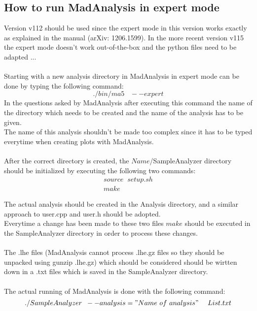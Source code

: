 \subsection{How to run MadAnalysis in expert mode}
Version v112 should be used since the expert mode in this version works exactly as explained in the manual (arXiv: 1206.1599). 
In the more recent version v115 the expert mode doesn't work out-of-the-box and the python files need to be adapted ...\\
\\
Starting with a new analysis directory in MadAnalysis in expert mode can be done by typing the following command:
\begin{equation}
  ./bin/ma5 \; \; \; --expert
\end{equation}
In the questions asked by MadAnalysis after executing this command the name of the directory which needs to be created and the name of the analysis has to be given.\\
The name of this analysis shouldn't be made too complex since it has to be typed everytime when creating plots with MadAnalysis.\\
\\
After the correct directory is created, the $Name$/SampleAnalyzer directory should be initialized by executing the following two commands:
\begin{eqnarray}
  source \; \; setup.sh \\
  make
\end{eqnarray}

The actual analysis should be created in the Analysis directory, and a similar approach to user.cpp and user.h should be adopted.\\
Everytime a change has been made to these two files $make$ should be executed in the SampleAnalyzer directory in order to process these changes.\\
\\
The .lhe files (MadAnalysis cannot process .lhe.gz files so they should be unpacked using gunzip .lhe.gz) which should be considered should be wirtten down in a .txt files which is saved in the SampleAnalyzer directory. \\
\\
The actual running of MadAnalysis is done with the following command:
\begin{equation}
  ./SampleAnalyzer \; \; --analysis="Name ~ of ~ analysis" ~~~~ List.txt
\end{equation}

